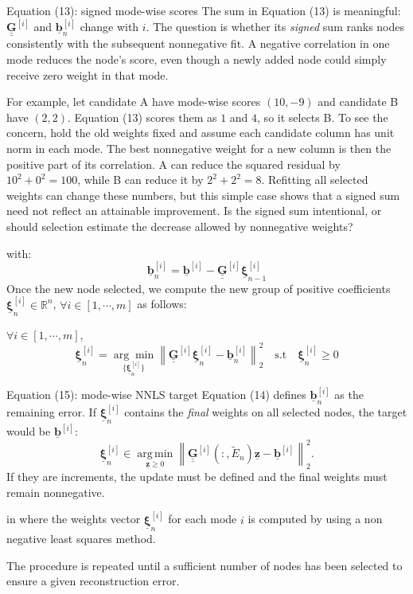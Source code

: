 \documentclass[a4paper,12pt]{article}
\newcommand{\vect}[1]{\underline{\boldsymbol{#1}}}
\newcommand{\matr}[1]{\underline{\underline{\boldsymbol{#1}}}}
\newcommand{\lecturanota}[2]{\begin{lecturalarga}{#1}#2\end{lecturalarga}}
\begin{document}
\lecturanota{Equation (13): signed mode-wise scores}{
The sum in Equation (13) is meaningful: $\matr{G}^{[i]}$ and $\vect{b}_n^{[i]}$ change with $i$. The question is whether its \emph{signed} sum ranks nodes consistently with the subsequent nonnegative fit. A negative correlation in one mode reduces the node's score, even though a newly added node could simply receive zero weight in that mode.

For example, let candidate A have mode-wise scores $(10,-9)$ and candidate B have $(2,2)$. Equation (13) scores them as $1$ and $4$, so it selects B. To see the concern, hold the old weights fixed and assume each candidate column has unit norm in each mode. The best nonnegative weight for a new column is then the positive part of its correlation. A can reduce the squared residual by $10^2+0^2=100$, while B can reduce it by $2^2+2^2=8$. Refitting all selected weights can change these numbers, but this simple case shows that a signed sum need not reflect an attainable improvement. Is the signed sum intentional, or should selection estimate the decrease allowed by nonnegative weights?
}

with:
\begin{equation}
\vect{b}_n^{[i]}=\vect{b}^{[i]}-\matr{G}^{[i]}\vect{\xi}_{n-1}^{[i]}
\label{eq:bm-remaining}
\end{equation}
Once the new node selected, we compute the new group of positive coefficients $\vect{\xi}_n^{[i]}\in\mathbb{R}^{n}$, $\forall i\in[1,\cdots,m]$ as follows:

\noindent$\forall i\in[1,\cdots,m],$
\begin{equation}
\vect{\xi}_n^{[i]}=
\underset{\{\vect{\xi}_n^{[i]}\}}{\arg\min}
\left\|\matr{G}^{[i]}\vect{\xi}_n^{[i]}-\vect{b}_n^{[i]}\right\|_2^2
\quad\text{s.t}\quad\vect{\xi}_n^{[i]}\geq 0
\label{eq:bm-nnls}
\end{equation}

\lecturanota{Equation (15): mode-wise NNLS target}{
Equation (14) defines $\vect{b}_n^{[i]}$ as the remaining error. If $\vect{\xi}_n^{[i]}$ contains the \emph{final} weights on all selected nodes, the target would be $\vect{b}^{[i]}$:
\[
  \vect{\xi}_n^{[i]}\in\operatorname*{arg\,min}_{\vect{z}\geq 0}
  \left\|\matr{G}^{[i]}(:,\widetilde{E}_n)\vect{z}-\vect{b}^{[i]}\right\|_2^2.
\]
If they are increments, the update must be defined and the final weights must remain nonnegative.
}


in where the weights vector $\vect{\xi}_n^{[i]}$ for each mode $i$ is computed by using a non negative least squares method.

The procedure is repeated until a sufficient number of nodes has been selected to ensure a given reconstruction error.
\end{document}
